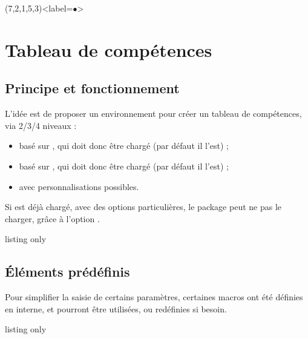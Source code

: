 \documentclass[french,11pt,a4paper]{article}
\begin{document}
\begin{DemoCode}{}
(7,2,1,5,3)<label=$\bullet$>
\end{DemoCode}

\pagebreak

\section{Tableau de compétences}

\subsection{Principe et fonctionnement}

L'idée est de proposer un environnement pour créer un tableau de compétences, via 2/3/4 niveaux :

\begin{itemize}
	\item basé sur , qui doit donc être chargé (par défaut il l'est) ;
	\item basé sur , qui doit donc être chargé (par défaut il l'est) ;
	\item avec personnalisations possibles.
\end{itemize}

Si  est déjà chargé, avec des options particulières, le package peut ne pas le charger, grâce à l'option .

\begin{DemoCode}{listing only}
\end{DemoCode}

\begin{DemoCode}{}
\end{DemoCode}

\subsection{Éléments prédéfinis}

Pour simplifier la saisie de certains paramètres, certaines macros ont été définies en interne, et pourront être utilisées, ou redéfinies si besoin.

\begin{DemoCode}{listing only}
\def\LabelNoteComp{Note}
\def\LstDeuxNiv{NA § A}
\def\LstTroisNiv{NA § ECA § A}
\def\LstQuatreNiv{NA § PA § ECA § A}
\def\NoticeDeuxNiv{Non acquis § Acquis}
\def\NoticeTroisNiv{Non acquis § En cours d'acquis. § Acquis}
\def\NoticeQuatreNiv{Non acquis § Part. acquis § En cours d'acquis. § Acquis}
\end{DemoCode}
\end{document}
